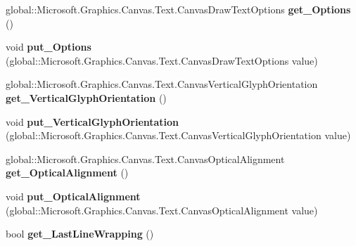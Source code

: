 \begin{DoxyCompactItemize}
global\+::\+Microsoft.\+Graphics.\+Canvas.\+Text.\+Canvas\+Draw\+Text\+Options {\bfseries get\+\_\+\+Options} ()
\item 
\mbox{\label{class_microsoft_1_1_graphics_1_1_canvas_1_1_text_1_1_canvas_text_format_a2cb2c8c70a2db084b058574b75fbe1fb}} 
void {\bfseries put\+\_\+\+Options} (global\+::\+Microsoft.\+Graphics.\+Canvas.\+Text.\+Canvas\+Draw\+Text\+Options value)
\item 
\mbox{\label{class_microsoft_1_1_graphics_1_1_canvas_1_1_text_1_1_canvas_text_format_ac501273bff089574992daf9dd1c47eb8}} 
global\+::\+Microsoft.\+Graphics.\+Canvas.\+Text.\+Canvas\+Vertical\+Glyph\+Orientation {\bfseries get\+\_\+\+Vertical\+Glyph\+Orientation} ()
\item 
\mbox{\label{class_microsoft_1_1_graphics_1_1_canvas_1_1_text_1_1_canvas_text_format_a78bb0a96f5140c39fdae9d2808bd58a0}} 
void {\bfseries put\+\_\+\+Vertical\+Glyph\+Orientation} (global\+::\+Microsoft.\+Graphics.\+Canvas.\+Text.\+Canvas\+Vertical\+Glyph\+Orientation value)
\item 
\mbox{\label{class_microsoft_1_1_graphics_1_1_canvas_1_1_text_1_1_canvas_text_format_a531fd44472e54817a9c459cce652d68f}} 
global\+::\+Microsoft.\+Graphics.\+Canvas.\+Text.\+Canvas\+Optical\+Alignment {\bfseries get\+\_\+\+Optical\+Alignment} ()
\item 
\mbox{\label{class_microsoft_1_1_graphics_1_1_canvas_1_1_text_1_1_canvas_text_format_a425c22e2e7141efc0555fd442659f0b7}} 
void {\bfseries put\+\_\+\+Optical\+Alignment} (global\+::\+Microsoft.\+Graphics.\+Canvas.\+Text.\+Canvas\+Optical\+Alignment value)
\item 
\mbox{\label{class_microsoft_1_1_graphics_1_1_canvas_1_1_text_1_1_canvas_text_format_aa855b7b2956b2494052e9cdd55b02fb4}} 
bool {\bfseries get\+\_\+\+Last\+Line\+Wrapping} ()
\item 

\end{DoxyCompactItemize}
